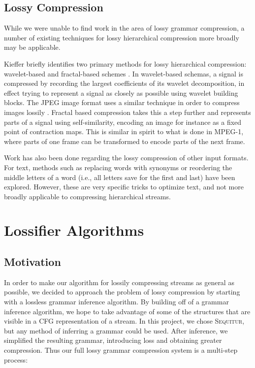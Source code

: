 \documentclass[11pt]{article}
\newcommand{\Sequitur}{\textsc{Sequitur}\xspace}
\begin{document}
\subsection{Lossy Compression}

While we were unable to find work in the area of lossy grammar compression, a
number of existing techniques for lossy hierarchical compression more broadly
may be applicable.

Kieffer briefly identifies two primary methods for lossy hierarchical
compression: wavelet-based and fractal-based schemes \cite{tutorial}.  In
wavelet-based schemas, a signal is compressed by recording the largest
coefficients of its wavelet decomposition, in effect trying to represent a
signal as closely as possible using wavelet building blocks.  The JPEG image
format uses a similar technique in order to compress images lossily
\cite{jpeg}.  Fractal based compression takes this a step further and
represents parts of a signal using self-similarity, encoding an image for
instance as a fixed point of contraction maps.  This is similar in spirit to
what is done in MPEG-1, where parts of one frame can be transformed to encode
parts of the next frame.

Work has also been done regarding the lossy compression of other input formats.
For text, methods such as replacing words with synonyms \cite{semanticlossy} or
reordering the middle letters of a word (i.e., all letters save for the first
and last) \cite{semilossless} have been explored.  However, these are very
specific tricks to optimize text, and not more broadly applicable to
compressing hierarchical streams.

\section{Lossifier Algorithms}

\subsection{Motivation}

In order to make our algorithm for lossily compressing streams as general as
possible, we decided to approach the problem of lossy compression by starting
with a lossless grammar inference algorithm.  By building off of a grammar
inference algorithm, we hope to take advantage of some of the structures that
are visible in a CFG representation of a stream.  In this project, we chose
\Sequitur, but any method of inferring a grammar could be used.  After
inference, we simplified the resulting grammar, introducing loss and obtaining
greater compression.  Thus our full lossy grammar compression system is a
multi-step process:
\end{document}
